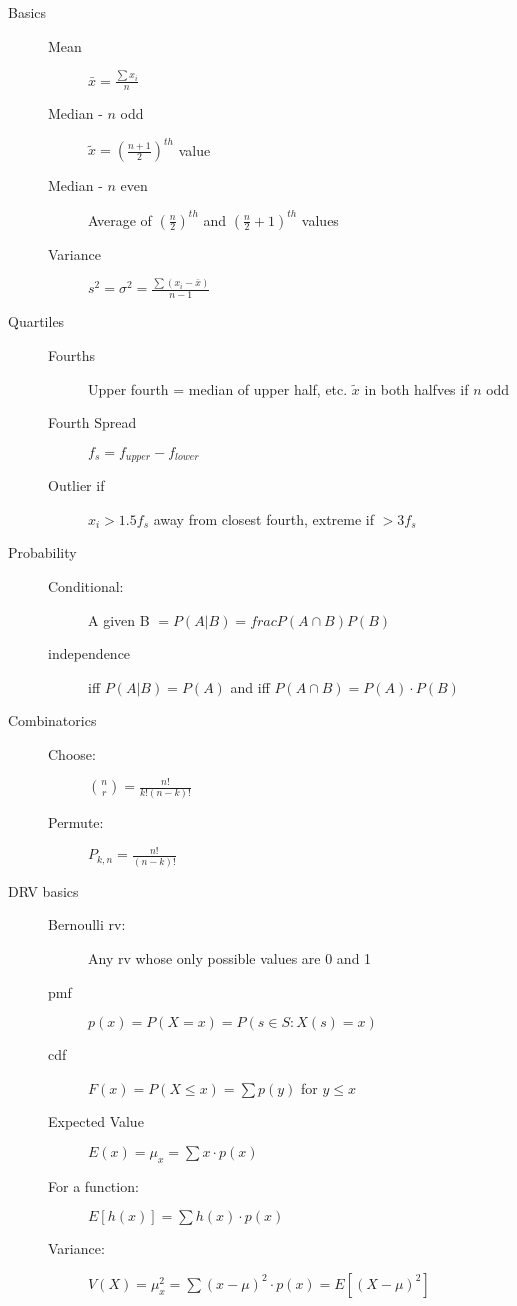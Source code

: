\documentclass[12pt]{letter}
\begin{document}
\begin{multicols}{2}
\begin{description}
  \item[Basics]
    \begin{description}
    \item[Mean] $\bar{x} = \frac{\sum x_i}{n}$
    \item[Median - $n$ odd] $\tilde{x} = \left( \frac{n+1}{2} \right)^{th}$ value
    \item[Median - $n$ even] Average of $\left( \frac{n}{2} \right)^{th}$ and $\left( \frac{n}{2} + 1\right)^{th}$ values
    \item[Variance] $s^2 = \sigma^2 = \frac{\sum(x_i - \bar{x})}{n-1}$
    \end{description}

  \item[Quartiles]
    \begin{description}
    \item[Fourths] Upper fourth = median of upper half, etc.  $\tilde{x}$ in both halfves if $n$ odd
    \item[Fourth Spread] $f_s = f_{upper} - f_{lower}$
    \item[Outlier if] $x_i > 1.5f_s$ away from closest fourth, extreme if $> 3f_s$  
    \end{description}

  \item[Probability]
    \begin{description}
    \item[Conditional:] A given B $ = P(A|B) = frac{P(A \cap B)}{P(B)}$
    \item[independence] iff $P(A|B) = P(A)$ and iff $P(A \cap B) = P(A)\cdot P(B)$
    \end{description}

  \item[Combinatorics]
    \begin{description}
    \item[Choose:] ${n \choose r} = \frac{n!}{k!(n-k)!}$
    \item[Permute:] $P_{k,n} = \frac{n!}{(n-k)!}$
    \end{description}

  \item[DRV basics]
    \begin{description}
    \item[Bernoulli rv:] Any rv whose only possible values are 0 and 1
    \item[pmf] $p(x) = P(X=x) = P(s \in S: X(s) = x)$
    \item[cdf] $F(x) = P(X \leq x) = \sum p(y) $ for $y \leq x$
    \item[Expected Value] $E(x) = \mu_x = \sum x \cdot p(x)$
    \item[For a function:] $E[h(x)] = \sum h(x) \cdot p(x)$
    \item[Variance:] $V(X) = \mu_x^2 = \sum (x - \mu)^2 \cdot p(x) = E[(X-\mu)^2]$
    \end{description}


\end{description}
\end{multicols}
\end{document}
